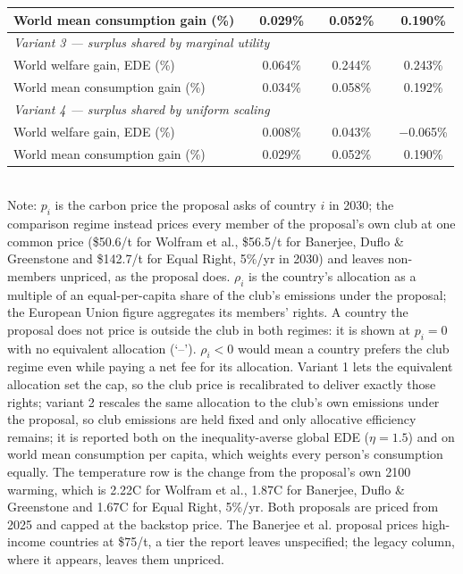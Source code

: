 \begin{table}[htbp]
\begin{tabular}{lcccccc}
  \quad World mean consumption gain (\%) &  & 0.029\% &  & 0.052\% &  & 0.190\% \\
  \midrule
  \multicolumn{7}{l}{\textit{Variant 3 --- surplus shared by marginal utility}} \\
  \quad World welfare gain, EDE (\%) &  & 0.064\% &  & 0.244\% &  & 0.243\% \\
  \quad World mean consumption gain (\%) &  & 0.034\% &  & 0.058\% &  & 0.192\% \\
  \midrule
  \multicolumn{7}{l}{\textit{Variant 4 --- surplus shared by uniform scaling}} \\
  \quad World welfare gain, EDE (\%) &  & 0.008\% &  & 0.043\% &  & $-$0.065\% \\
  \quad World mean consumption gain (\%) &  & 0.029\% &  & 0.052\% &  & 0.190\% \\
  \bottomrule
\end{tabular}
\label{tab:equiv_rights_A}
\\[4pt]
{\footnotesize Note: $p_i$ is the carbon price the proposal asks of country $i$ in 2030; the comparison regime instead prices every member of the proposal's own club at one common price (\$50.6/t for Wolfram et al., \$56.5/t for Banerjee, Duflo \& Greenstone and \$142.7/t for Equal Right, 5\%/yr in 2030) and leaves non-members unpriced, as the proposal does. $\rho_i$ is the country's allocation as a multiple of an equal-per-capita share of the club's emissions under the proposal; the European Union figure aggregates its members' rights. A country the proposal does not price is outside the club in both regimes: it is shown at $p_i=0$ with no equivalent allocation (`--'). $\rho_i < 0$ would mean a country prefers the club regime even while paying a net fee for its allocation. Variant 1 lets the equivalent allocation set the cap, so the club price is recalibrated to deliver exactly those rights; variant 2 rescales the same allocation to the club's own emissions under the proposal, so club emissions are held fixed and only allocative efficiency remains; it is reported both on the inequality-averse global EDE ($\eta=1.5$) and on world mean consumption per capita, which weights every person's consumption equally. The temperature row is the change from the proposal's own 2100 warming, which is 2.22\textdegree{}C for Wolfram et al., 1.87\textdegree{}C for Banerjee, Duflo \& Greenstone and 1.67\textdegree{}C for Equal Right, 5\%/yr. Both proposals are priced from 2025 and capped at the backstop price. The Banerjee et al. proposal prices high-income countries at \$75/t, a tier the report leaves unspecified; the legacy column, where it appears, leaves them unpriced.}
\end{table}
